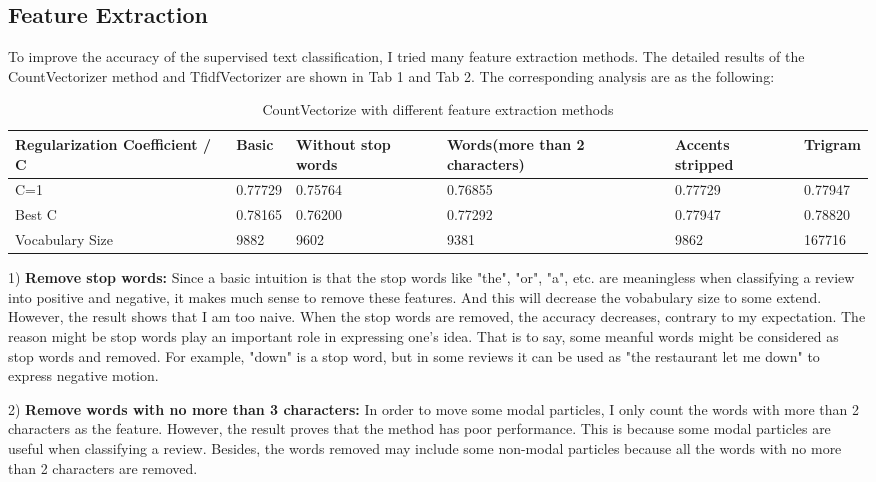 \documentclass[letterpaper, 10 pt, conference]{ieeeconf}  %
\begin{document}
\subsection{Feature Extraction}
To improve the accuracy of the supervised text classification, I tried many feature extraction methods. The detailed results of the CountVectorizer method and TfidfVectorizer are shown in Tab 1 and Tab 2. The corresponding analysis are as the following:

\begin{table}[htb]
	\caption{CountVectorize with different feature extraction methods}  
	\begin{center}  
		\begin{tabu} to 1\textwidth{X[3,c]|X[1,b]|X[2,l]|X[3,c]|X[2,m]|X[1,c]}  
			\hline  
			Regularization Coefficient / C  &Basic             &Without stop words      &Words(more than 2 characters)    &Accents stripped     &Trigram\\  
			\hline  
			C=1    &0.77729       &0.75764           &0.76855    &0.77729      &0.77947\\  
			Best C    &0.78165      &0.76200           &0.77292    &0.77947      &0.78820\\  
			Vocabulary Size    &9882      &9602           &9381   &9862      &167716\\  
			
			\hline  
		\end{tabu}  
	\end{center}  
\end{table} 

1) \textbf{Remove stop words: }Since a basic intuition is that the stop words like "the", "or", "a", etc. are meaningless when classifying a review into positive and negative, it makes much sense to remove these features. And this will decrease the vobabulary size to some extend. However, the result shows that I am too naive. When the stop words are removed, the accuracy decreases, contrary to my expectation. The reason might be stop words play an important role in expressing one's idea. That is to say, some meanful words might be considered as stop words and removed. For example, "down" is a stop word, but in some reviews it can be used as "the restaurant let me down" to express negative motion.

2) \textbf{Remove words with no more than 3 characters: }In order to move some modal particles, I only count the words with more than 2 characters as the feature. However, the result proves that the method has poor performance. This is because some modal particles are useful when classifying a review. Besides, the words removed may include some non-modal particles because all the words with no more than 2 characters are removed.
\end{document}
